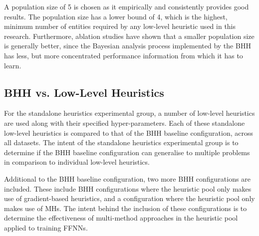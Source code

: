 \documentclass[preprint,review,12pt]{elsarticle}
\begin{document}
\begin{table}[htb]
	\centering
	\caption{The \acs{BHH} baseline configuration as it is used in the empirical study.}
	\label{tab:methodology:bhh_baseline_configuration}%
	\par\bigskip
\end{table}%

A population size of 5 is chosen as it empirically and consistently provides good results. The population size has a lower bound of 4, which is the highest, minimum number of entities required by any low-level heuristic used in this research. Furthermore, ablation studies \citep{ref:schreuder:2022} have shown that a smaller population size is generally better, since the Bayesian analysis process implemented by the \acs{BHH} has less, but more concentrated performance information from which it has to learn.


\subsection{BHH vs. Low-Level Heuristics}
\label{sec:methodology:experiments}

For the standalone heuristics experimental group, a number of low-level heuristics are used along with their specified hyper-parameters. Each of these standalone low-level heuristics is compared to that of the \acs{BHH} baseline configuration, across all datasets. The intent of the standalone heuristics experimental group is to determine if the \acs{BHH} baseline configuration can generalise to multiple problems in comparison to individual low-level heuristics.

Additional to the \acs{BHH} baseline configuration, two more \acs{BHH} configurations are included. These include \acs{BHH} configurations where the heuristic pool only makes use of gradient-based heuristics, and a configuration where the heuristic pool only makes use of \acp{MH}. The intent behind the inclusion of these configurations is to determine the effectiveness of multi-method approaches in the heuristic pool applied to training \acp{FFNN}.
\end{document}
